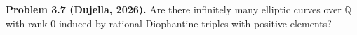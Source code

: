 \textbf{Problem 3.7 (Dujella, 2026).} Are there infinitely many elliptic curves over $\mathbb{Q}$ with rank 0 induced by rational Diophantine triples with positive elements?
